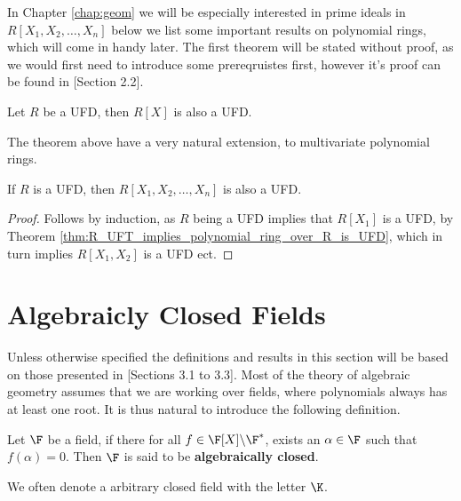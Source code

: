 In Chapter \ref{chap:geom} we will be especially interested in prime ideals in $R[X_1, X_2, \ldots, X_{n}]$ below we list some important results on polynomial rings, which will come in handy later. The first theorem will be stated without proof, as we would first need to introduce some prereqruistes first, however it's proof can be found in \cite{lang}[Section 2.2].
\begin{theorem}\label{thm:R_UFT_implies_polynomial_ring_over_R_is_UFD}
  Let $R$ be a UFD, then $R[X]$ is also a UFD.
\end{theorem}

The theorem above have a very natural extension, to multivariate polynomial rings.
\begin{corollary}\label{cor:multivariate_polynomial_ring_is_UFD}
  If $R$ is a UFD, then $R[X_1, X_2, \ldots, X_{n}]$ is also a UFD.
\end{corollary}

\begin{proof}
Follows by induction, as $R$ being a UFD implies that $R[X_{1}]$ is a UFD, by Theorem \ref{thm:R_UFT_implies_polynomial_ring_over_R_is_UFD}, which in turn implies $R[X_{1}, X_{2}]$ is a UFD ect.
\end{proof}

\section{Algebraicly Closed Fields}%
Unless otherwise specified the definitions and results in this section will be based on those presented in \citep{alg_notes}[Sections 3.1 to 3.3].
Most of the theory of algebraic geometry assumes that we are working over fields, where polynomials always has at least one root. It is thus natural to introduce the following definition.
\begin{definition}\label{def:alg_closed}
  Let $\F$ be a field, if there for all $f \in \F[X] \backslash \F^*$, exists an $\alpha \in \F$ such that $f(\alpha) = 0$. Then $\F$ is said to be \textbf{algebraically closed}.
\end{definition}
\begin{remark}
  We often denote a arbitrary closed field with the letter $\K$.
\end{remark}

